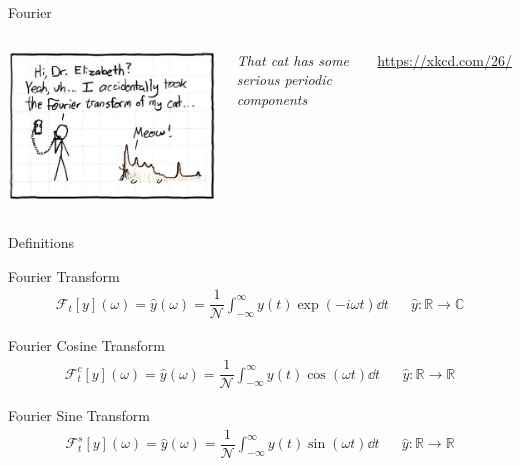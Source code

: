 \begin{frame}{Fourier}
%
\begin{columns}
\begin{center}
\includegraphics[width=\linewidth]{./gfx/05-xkcd-fourier}\\
\end{center}
%
\small
	\emph{That cat has some serious periodic components}

	\vspace{6pt}
	\url{https://xkcd.com/26/}
\end{columns}
%
\end{frame}


\begin{frame}{Definitions}
%
\begin{defbox}
\small
Fourier Transform
\begin{align*}
	\mathcal{F}_t[y](\omega)
=
	\hat{y}(\omega)
=
	\dfrac{1}{\mathcal{N}}	
	\int_{-\infty}^{\infty}
		y(t) \exp(-i\omega t) \dd{t}
&&
	\hat{y}: \mathbb{R} \to \mathbb{C}
\end{align*}

Fourier Cosine Transform
\begin{align*}
	\mathcal{F}^c_t[y](\omega)
=
	\hat{y}(\omega)
=
	\dfrac{1}{\mathcal{N}}
	\int_{-\infty}^{\infty}
		y(t) \cos(\omega t) \dd{t}
&&
	\hat{y}: \mathbb{R} \to \mathbb{R}
\end{align*}

Fourier Sine Transform
\begin{align*}
	\mathcal{F}^s_t[y](\omega)
=
	\hat{y}(\omega)
=
	\dfrac{1}{\mathcal{N}}
	\int_{-\infty}^{\infty}
		y(t) \sin(\omega t) \dd{t}
&&
	\hat{y}: \mathbb{R} \to \mathbb{R}
\end{align*}
\end{defbox}
%
\end{frame}

